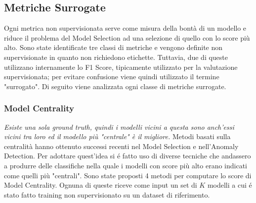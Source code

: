 \subsection{Metriche Surrogate}
Ogni metrica non supervisionata serve come misura della bontà di un modello e riduce il problema del Model Selection ad una selezione di quello con lo score più alto. 
Sono state identificate tre classi di metriche e vengono definite non supervisionate in quanto non richiedono etichette. Tuttavia, due di queste utilizzano internamente lo F1 Score, tipicamente utilizzato per la valutazione supervisionata; per evitare confusione viene quindi utilizzato il termine "surrogato".
Di seguito viene analizzata ogni classe di metriche surrogate. 


\subsubsection{Model Centrality}
\textit{Esiste una sola ground truth, quindi i modelli vicini a questa sono anch'essi vicini tra loro ed il modello più "centrale" è il migliore.}
Metodi basati sulla centralità hanno ottenuto successi recenti nel Model Selection e nell'Anomaly Detection. 
Per adottare quest'idea si é fatto uso di diverse tecniche che andassero a produrre delle classifiche nella quale i modelli con score più alto erano indicati come quelli più "centrali".
Sono state proposti 4 metodi per computare lo score di Model Centrality. Ognuna di queste riceve come input un set di $K$ modelli a cui é stato fatto training non supervisionato su un dataset di riferimento. 
